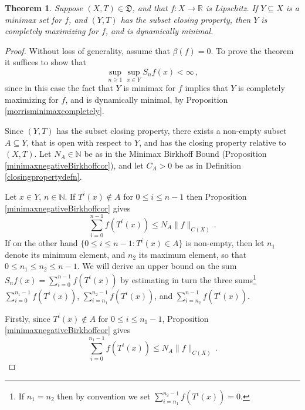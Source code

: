 \documentclass[reqno,11pt]{amsart}
\newtheorem{thm}{Theorem}[section]
\theoremstyle{definition}
\theoremstyle{remark}
\theoremstyle{remark}
\def \N {\mathbb N}
\def \R {\mathbb R}
\def\D{\mathfrak{D}}
\numberwithin{equation}{section}
\begin{document}
\begin{thm}\label{minimaxclosingcompletelymaximizing}
Suppose $(X,T)\in\D$, 
and that $f:X\to\R$ is Lipschitz.
If $Y\subseteq X$ is a minimax set for $f$, and $(Y,T)$ has the subset closing property,
then $Y$ is completely maximizing for $f$, and is dynamically minimal.
\end{thm}
\begin{proof}
Without loss of generality, assume that $\beta(f)=0$.
To prove the theorem it suffices to show that
\begin{equation}\label{aimtoshow}
\sup_{n\ge 1} \sup_{x\in Y} S_nf(x) <\infty\,,
\end{equation}
since in this case the fact that $Y$ is minimax for $f$ implies that
$Y$ is completely maximizing for $f$, and is dynamically minimal,
by Proposition \ref{morrisminimaxcompletely}.


Since $(Y,T)$ has the subset closing property, there exists a non-empty subset $A\subseteq Y$, that is open with respect to $Y$,
and has the closing property relative to $(X,T)$. Let 
$N_A\in\N$ be as in 
the Minimax Birkhoff Bound
(Proposition \ref{minimaxnegativeBirkhoffcor}),
and let $C_A>0$ be as in Definition \ref{closingpropertydefn}.

Let $x\in Y$, $n\in\N$.
If $T^i(x)\notin A$ for $0\le i\le n-1$ then
Proposition \ref{minimaxnegativeBirkhoffcor} gives 
\begin{equation}\label{headestimatenonly}
\sum_{i=0}^{n-1} f(T^i(x)) \le N_A\|f\|_{C(X)}\,.
\end{equation}
If on the other hand
$
\{ 0\le i\le n-1: T^i(x) \in A\}
$
is non-empty, then let $n_1$ denote its minimum element, and $n_2$ its maximum element,
so that $0\le n_1 \le n_2 \le n-1$.
We will derive an upper bound on the sum
$
 S_n f(x) = \sum_{i=0}^{n-1}f(T^i(x))
$
by estimating 
in turn
the three sums\footnote{If $n_1=n_2$ then by convention we set $\sum_{i=n_1}^{n_2-1} f(T^i(x))=0$.}
$\sum_{i=0}^{n_1-1} f(T^i(x))$, 
$\sum_{i=n_1}^{n_2-1} f(T^i(x))$,
and
$\sum_{i=n_2}^{n-1} f(T^i(x))$. 

Firstly, since $T^i(x)\notin A$ for $0\le i\le n_1-1$,
Proposition \ref{minimaxnegativeBirkhoffcor} gives 
\begin{equation}\label{headestimate}
\sum_{i=0}^{n_1-1} f(T^i(x)) \le N_A\|f\|_{C(X)}\,.
\end{equation}


\end{proof}
\end{document}
